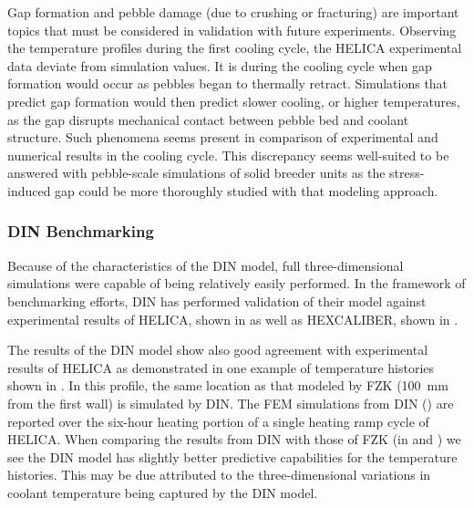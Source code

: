 Gap formation and pebble damage (due to crushing or fracturing) are important topics that must be considered in validation with future experiments. Observing the temperature profiles during the first cooling cycle, the HELICA experimental data deviate from simulation values. It is during the cooling cycle when gap formation would occur as pebbles began to thermally retract. Simulations that predict gap formation would then predict slower cooling, or higher temperatures, as the gap disrupts mechanical contact between pebble bed and coolant structure. Such phenomena seems present in comparison of experimental and numerical results in the cooling cycle. This discrepancy seems well-suited to be answered with pebble-scale simulations of solid breeder units as the stress-induced gap could be more thoroughly studied with that modeling approach.

\FloatBarrier
\subsubsection{DIN Benchmarking}
Because of the characteristics of the DIN model, full three-dimensional simulations were capable of being relatively easily performed. In the framework of benchmarking efforts, DIN has performed validation of their model against experimental results of HELICA, shown in  as well as HEXCALIBER, shown in .

The results of the DIN model show also good agreement with experimental results of HELICA as demonstrated in one example of temperature histories shown in . In this profile, the same location as that modeled by FZK (\SI{100}{\milli\meter} from the first wall) is simulated by DIN. The FEM simulations from DIN () are reported over the six-hour heating portion of a single heating ramp cycle of HELICA. When comparing the results from DIN with those of FZK (in  and ) we see the DIN model has slightly better predictive capabilities for the temperature histories. This may be due attributed to the three-dimensional variations in coolant temperature being captured by the DIN model. 


